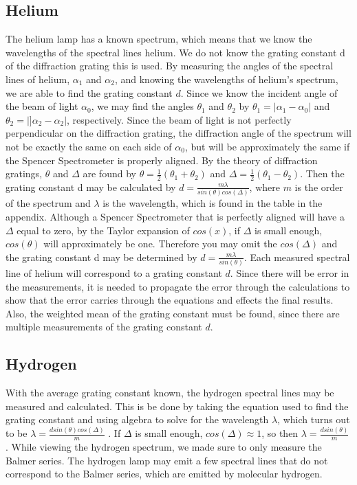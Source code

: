 \documentclass[a4paper]{article}
\begin{document}
\subsection{Helium}
The helium lamp has a known spectrum, which means that we know the wavelengths of the spectral lines helium. We do not know the grating constant d of the diffraction grating this is used. By measuring the angles of the spectral lines of helium, $\alpha_1$ and $\alpha_2$, and knowing the wavelengths of helium's spectrum, we are able to find the grating constant $d$. Since we know the incident angle of the beam of light $\alpha_0$, we may find the angles $\theta_1$ and $\theta_2$ by $\theta_1 = |\alpha_1 − \alpha_0|$ and $\theta_2 = |]\alpha_2 −\alpha_2|$, respectively. Since the beam of light is not perfectly perpendicular on the diffraction grating, the diffraction angle of the spectrum will not be exactly the same on each side of $\alpha_0$, but will be approximately the same if the Spencer Spectrometer is properly aligned. By the theory of diffraction gratings, $\theta$ and $\Delta$ are found by $\theta = \frac{1}{2}(\theta_1 + \theta_2)$ and $\Delta = \frac{1}{2}(\theta_1 −\theta_2)$. Then the grating constant d may be calculated by $d = \frac{m\lambda}{sin(\theta)cos(\Delta)}$, where $m$ is the order of the spectrum and $\lambda$ is the wavelength, which is found in the table in the appendix. Although a Spencer Spectrometer that is perfectly aligned will have a $\Delta$ equal to zero, by the Taylor expansion of $cos(x)$, if $\Delta$ is small enough, $cos(\theta)$ will approximately be one. Therefore you may omit the $cos(\Delta)$ and the grating constant d may be determined by $d = \frac{m\lambda}{sin(\theta)}$. Each measured spectral line of helium will correspond to a grating constant $d$. Since there will be error in the measurements, it is needed to propagate the error through the calculations to show that the error carries through the equations and effects the final results. Also, the weighted mean of the grating constant must be found, since there are multiple measurements of the grating constant $d$.
\subsection{Hydrogen}
With the average grating constant known, the hydrogen spectral lines may be measured and calculated. This is be done by taking the equation used to find the grating constant and using algebra to solve for the wavelength $\lambda$, which turns out to be $\lambda = \frac{dsin(\theta)cos(\Delta)}{m}$ . If $\Delta$ is small enough, $cos(\Delta) ≈ 1$, so then $\lambda = \frac{dsin(\theta)}{m}$ . While viewing the hydrogen spectrum, we made sure to only measure the Balmer series. The hydrogen lamp may emit a few spectral lines that do not correspond to the Balmer series, which are emitted by molecular hydrogen.
\end{document}
